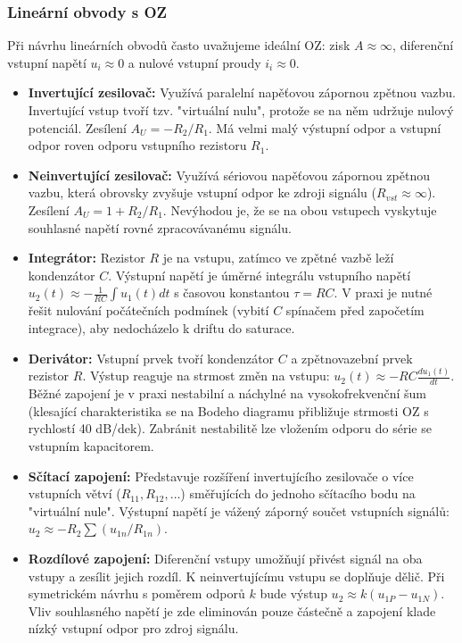     \subsubsection{Lineární obvody s OZ}
        Při návrhu lineárních obvodů často uvažujeme ideální OZ: zisk $A \approx \infty$, diferenční vstupní napětí $u_i \approx 0$ a nulové vstupní proudy $i_i \approx 0$.
        \begin{itemize}
            \item \textbf{Invertující zesilovač:} Využívá paralelní napěťovou zápornou zpětnou vazbu. Invertující vstup tvoří tzv. "virtuální nulu", protože se na něm udržuje nulový potenciál. Zesílení $A_U = -R_2/R_1$. Má velmi malý výstupní odpor a vstupní odpor roven odporu vstupního rezistoru $R_1$.
            \item \textbf{Neinvertující zesilovač:} Využívá sériovou napěťovou zápornou zpětnou vazbu, která obrovsky zvyšuje vstupní odpor ke zdroji signálu ($R_{vst} \approx \infty$). Zesílení $A_U = 1 + R_2/R_1$. Nevýhodou je, že se na obou vstupech vyskytuje souhlasné napětí rovné zpracovávanému signálu.
            \item \textbf{Integrátor:} Rezistor $R$ je na vstupu, zatímco ve zpětné vazbě leží kondenzátor $C$. Výstupní napětí je úměrné integrálu vstupního napětí $u_2(t) \approx -\frac{1}{RC} \int u_1(t)dt$ s časovou konstantou $\tau = RC$. V praxi je nutné řešit nulování počátečních podmínek (vybití $C$ spínačem před započetím integrace), aby nedocházelo k driftu do saturace.
            \item \textbf{Derivátor:} Vstupní prvek tvoří kondenzátor $C$ a zpětnovazební prvek rezistor $R$. Výstup reaguje na strmost změn na vstupu: $u_2(t) \approx -RC \frac{du_1(t)}{dt}$. Běžné zapojení je v praxi nestabilní a náchylné na vysokofrekvenční šum (klesající charakteristika se na Bodeho diagramu přibližuje strmosti OZ s rychlostí 40 dB/dek). Zabránit nestabilitě lze vložením odporu do série se vstupním kapacitorem.
            \item \textbf{Sčítací zapojení:} Představuje rozšíření invertujícího zesilovače o více vstupních větví ($R_{11}, R_{12}, \dots$) směřujících do jednoho sčítacího bodu na "virtuální nule". Výstupní napětí je vážený záporný součet vstupních signálů: $u_2 \approx -R_2 \sum (u_{1n}/R_{1n})$.
            \item \textbf{Rozdílové zapojení:} Diferenční vstupy umožňují přivést signál na oba vstupy a zesílit jejich rozdíl. K neinvertujícímu vstupu se doplňuje dělič. Při symetrickém návrhu s poměrem odporů $k$ bude výstup $u_2 \approx k(u_{1P} - u_{1N})$. Vliv souhlasného napětí je zde eliminován pouze částečně a zapojení klade nízký vstupní odpor pro zdroj signálu.

\end{itemize}
